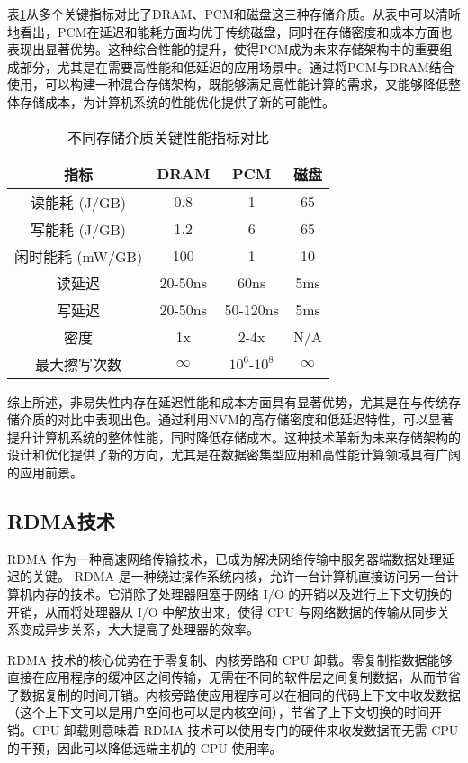 表\ref{tab:storage_comparison}从多个关键指标对比了DRAM、PCM和磁盘这三种存储介质。从表中可以清晰地看出，PCM在延迟和能耗方面均优于传统磁盘，同时在存储密度和成本方面也表现出显著优势。这种综合性能的提升，使得PCM成为未来存储架构中的重要组成部分，尤其是在需要高性能和低延迟的应用场景中。通过将PCM与DRAM结合使用，可以构建一种混合存储架构，既能够满足高性能计算的需求，又能够降低整体存储成本，为计算机系统的性能优化提供了新的可能性。

\begin{table}[htb]
    \centering
    \caption{不同存储介质关键性能指标对比}
    \label{tab:storage_comparison}
    \begin{tabular}{cccc}
    \toprule
    指标       & DRAM     & PCM      & 磁盘      \\
    \midrule
    读能耗 (J/GB) & 0.8      & 1        & 65       \\
    写能耗 (J/GB) & 1.2      & 6        & 65       \\
    闲时能耗 (mW/GB) & 100      & 1        & 10       \\
    读延迟     & 20-50ns   & 60ns      & 5ms       \\
    写延迟     & 20-50ns   & 50-120ns  & 5ms       \\
    密度       & 1x       & 2-4x     & N/A      \\
    最大擦写次数   & $\infty$ & $10^6$-$10^8$ & $\infty$ \\
    \bottomrule
    \end{tabular}
    \end{table}
综上所述，非易失性内存在延迟性能和成本方面具有显著优势，尤其是在与传统存储介质的对比中表现出色。通过利用NVM的高存储密度和低延迟特性，可以显著提升计算机系统的整体性能，同时降低存储成本。这种技术革新为未来存储架构的设计和优化提供了新的方向，尤其是在数据密集型应用和高性能计算领域具有广阔的应用前景。

\subsection{RDMA技术}

 RDMA 作为一种高速网络传输技术，已成为解决网络传输中服务器端数据处理延迟的关键。 RDMA 是一种绕过操作系统内核，允许一台计算机直接访问另一台计算机内存的技术。它消除了处理器阻塞于网络 I/O 的开销以及进行上下文切换的开销，从而将处理器从 I/O 中解放出来，使得 CPU 与网络数据的传输从同步关系变成异步关系，大大提高了处理器的效率。

 RDMA 技术的核心优势在于零复制、内核旁路和 CPU 卸载。零复制指数据能够直接在应用程序的缓冲区之间传输，无需在不同的软件层之间复制数据，从而节省了数据复制的时间开销。内核旁路使应用程序可以在相同的代码上下文中收发数据（这个上下文可以是用户空间也可以是内核空间），节省了上下文切换的时间开销。CPU 卸载则意味着 RDMA 技术可以使用专门的硬件来收发数据而无需 CPU 的干预，因此可以降低远端主机的 CPU 使用率。

